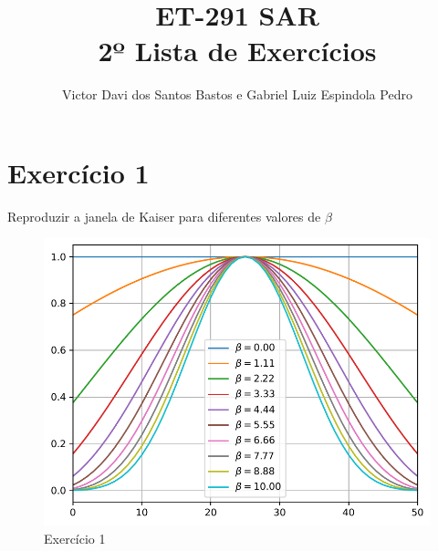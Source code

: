 \documentclass[english]{sbrt}
\begin{document}
\title{ET-291 SAR \\ 2º Lista de Exercícios}

\author{Victor Davi dos Santos Bastos e Gabriel Luiz Espindola Pedro
}

\maketitle





\section{Exercício 1}

Reproduzir a janela de Kaiser para diferentes valores de $\beta$

\begin{figure}[htb]
    \centering
    \includegraphics[width=0.95\linewidth]{kaiser_beta.pdf}
    \caption{Exercício 1}
    \label{fig:Exercício 1}
\end{figure}
\end{document}
